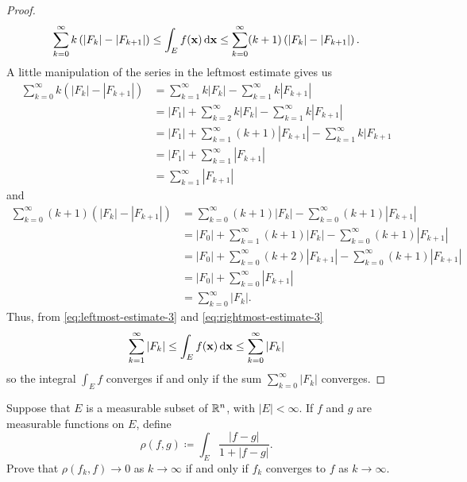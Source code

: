 \begin{proof}
\begin{equation}
\sum_{k=0}^\infty k\left(|F_k|-|F_{k+1}|\right)\leq
\int_E f(\mathbf{x})\mathop{}\!\mathrm{d}\mathbf{x}\leq
\sum_{k=0}^\infty (k+1)\left(|F_k|-|F_{k+1}|\right).
\end{equation}
A little manipulation of the series in the leftmost estimate gives us
\begin{equation}
\label{eq:leftmost-estimate-3}
\begin{aligned}
\sum_{k=0}^\infty k\left(|F_k|-|F_{k+1}|\right)
&=\sum_{k=1}^\infty k|F_k|-\sum_{k=1}^\infty k|F_{k+1}|\\
&=|F_1|+\sum_{k=2}^\infty k|F_k|-\sum_{k=1}^\infty k|F_{k+1}|\\
&=|F_1|+\sum_{k=1}^\infty(k+1)|F_{k+1}|-\sum_{k=1}^\infty k|F_{k+1}\\
&=|F_1|+\sum_{k=1}^\infty |F_{k+1}|\\
&=\sum_{k=1}^\infty|F_{k+1}|
\end{aligned}
\end{equation}
and
\begin{equation}
\label{eq:rightmost-estimate-3}
\begin{aligned}
\sum_{k=0}^\infty(k+1)\left(|F_k|-|F_{k+1}|\right)
&=\sum_{k=0}^\infty(k+1)|F_k|-\sum_{k=0}^\infty(k+1)|F_{k+1}|\\
&=|F_0|+\sum_{k=1}^\infty(k+1)|F_k|-\sum_{k=0}^\infty(k+1)|F_{k+1}|\\
&=|F_0|+\sum_{k=0}^\infty(k+2)|F_{k+1}|-\sum_{k=0}^\infty(k+1)|F_{k+1}|\\
&=|F_0|+\sum_{k=0}^\infty|F_{k+1}|\\
&=\sum_{k=0}^\infty|F_k|.
\end{aligned}
\end{equation}
Thus, from \eqref{eq:leftmost-estimate-3} and
\eqref{eq:rightmost-estimate-3}
\begin{equation}
\label{eq:final-upper-lower-estimates-3}
\sum_{k=1}^\infty|F_k|\leq\int_E f(\mathbf{x})\mathop{}\!\mathrm{d}\mathbf{x}\leq\sum_{k=0}^\infty|F_k|
\end{equation}
so the integral $\int_E f$ converges if and only if the sum
$\sum_{k=0}^\infty|F_k|$ converges.
\end{proof}
\begin{problem}
Suppose that $E$ is a measurable subset of $\mathbb{R}^n$, with
$|E|<\infty$. If $f$ and $g$ are measurable functions on
$E$, define
\[
\rho(f,g)\coloneqq\int_E\frac{|f-g|}{1+|f-g|}.
\]
Prove that $\rho(f_k,f)\to 0$ as $k\to\infty$ if and only if $f_k$
converges to $f$ as $k\to\infty$.
\end{problem}
